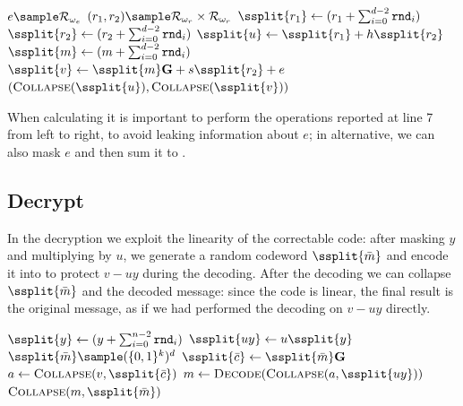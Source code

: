     \begin{algorithm2e}[H]
        \caption{Encrypt($\kpub$, $m$)}
        $e \sample \mathcal{R}_{\omega_e}$\;
        $(r_1,r_2) \sample \mathcal{R}_{\omega_r} \times \mathcal{R}_{\omega_r}$\;
        $\ssplit{r_1} \gets (r_1+\sum_{i=0}^{d-2} \mathtt{rnd}_i)$\;
        $\ssplit{r_2} \gets (r_2+\sum_{i=0}^{d-2} \mathtt{rnd}_i)$\;
        $\ssplit{u} \gets \ssplit{r_1} + h\ssplit{r_2}$\;
        $\ssplit{m} \gets (m+\sum_{i=0}^{d-2} \mathtt{rnd}_i) $\;
        $\ssplit{v} \gets \ssplit{m}\mathbf{G} + s \ssplit{r_2} + e $\;
        \KwRet $(\textsc{Collapse}(\ssplit{u}),\textsc{Collapse}(\ssplit{v}))$\;
    \end{algorithm2e}
    When calculating  it is important to perform the operations reported at line 7 from left to right, to avoid leaking
    information about $e$; in alternative, we can also mask $e$ and then sum it to .


    \subsection{Decrypt}
    In the decryption we exploit the linearity of the correctable code: after masking $y$ and multiplying by $u$, we 
    generate a random codeword $\ssplit{\bar{m}}$ and encode it into  to protect $v-uy$ during the decoding.
    After the decoding we can collapse $\ssplit{\bar{m}}$ and the decoded message: since the code is linear, the final result
    is the original message, as if we had performed the decoding on $v-uy$ directly.
    \begin{algorithm2e}
        \caption{Decrypt($\kpri$, $c$)}
        $\ssplit{y} \gets (y+\sum_{i=0}^{n-2} \mathtt{rnd}_i)$\;
        $\ssplit{uy} \gets u \ssplit{y}$\;
        $\ssplit{\bar{m}} \sample (\{0,1\}^k)^d$\;
        $\ssplit{\bar{c}} \gets \ssplit{\bar{m}}\mathbf{G}$\; 
        $a \gets \text{\sc Collapse}(v ,\ssplit{\bar{c}})$\;
        $m \gets \text{\sc Decode}(\text{\sc Collapse}(a,\ssplit{uy}))$\;
        \KwRet $\text{\sc Collapse}(m ,\ssplit{\bar{m}})$\;
    \end{algorithm2e}